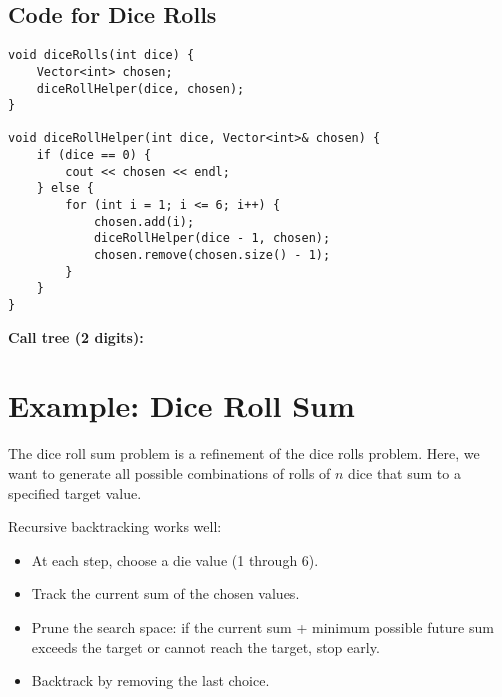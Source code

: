 \documentclass{article}
\begin{document}
\subsection*{Code for Dice Rolls}

\begin{lstlisting}[style=cppstyle]
void diceRolls(int dice) {
    Vector<int> chosen;
    diceRollHelper(dice, chosen);
}

void diceRollHelper(int dice, Vector<int>& chosen) {
    if (dice == 0) {
        cout << chosen << endl;
    } else {
        for (int i = 1; i <= 6; i++) {
            chosen.add(i);
            diceRollHelper(dice - 1, chosen);
            chosen.remove(chosen.size() - 1);
        }
    }
}
\end{lstlisting}

\textbf{Call tree (2 digits):}

\begin{center}
\end{center}

\section{Example: Dice Roll Sum}

The dice roll sum problem is a refinement of the dice rolls problem.  
Here, we want to generate all possible combinations of rolls of $n$ dice that sum to a specified target value.  

Recursive backtracking works well:
\begin{itemize}
    \item At each step, choose a die value (1 through 6).
    \item Track the current sum of the chosen values.
    \item Prune the search space: if the current sum + minimum possible future sum exceeds the target or cannot reach the target, stop early.
    \item Backtrack by removing the last choice.
\end{itemize}
\end{document}
